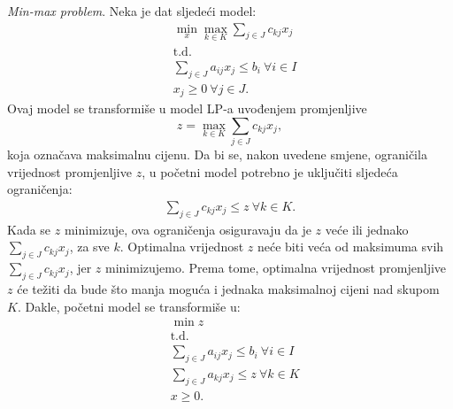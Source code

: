 \documentclass[b5paper, utf8, 11pt, colorlinks]{book}
\theoremstyle{definition}
\begin{document}
\emph{Min-max problem}. Neka je dat sljedeći model: 
\begin{align*}
	 &\min_{x} \max_{k \in K} \sum_{j \in J} c_{kj} x_j \\
	 &{\mbox{t.d.}} \nonumber \\
	 & \sum_{j \in J} a_{ij} x_j \leq b_i\  \forall i \in I \\
	 & x_j \geq 0\ \forall j \in J.
 \end{align*}
 Ovaj  model se transformiše u model LP-a uvođenjem promjenljive 
  $$z=\max_{k \in K} \sum_{j \in J} c_{kj}x_j,$$
   koja označava maksimalnu cijenu. Da bi se, nakon uvedene smjene, ograničila vrijednost promjenljive $z$, u početni model potrebno je uključiti sljedeća ograničenja: 
 \begin{eqnarray}
 	\sum_{j \in J} c_{kj} x_j \leq z\ \forall k \in K.
 \end{eqnarray}
 Kada se $z$ minimizuje, ova ograničenja osiguravaju da je $z$ veće ili jednako  $\sum_{j \in J} c_{kj}x_j$, za sve $k$. Optimalna vrijednost $z$ neće biti veća od maksimuma svih $\sum_{j \in J} c_{kj}x_j$, jer  $z$ minimizujemo. Prema tome, optimalna vrijednost promjenljive $z$ će težiti da bude što manja moguća i jednaka maksimalnoj cijeni nad skupom $K$. Dakle, početni model se transformiše u:
\begin{align*}
	&\min z \\
     &{\mbox{t.d.}} \nonumber \\
 	&\sum_{j \in J} a_{ij} x_j \leq b_i\  \forall i \in I \\ 
 	& 	 \sum_{j \in J} a_{kj} x_j \leq z\ \forall k \in K \\
 	& x \geq 0.
 \end{align*}
\end{document}
